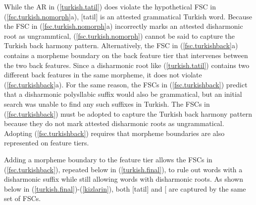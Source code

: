 \documentclass[,doc,floatsintext]{apa6}
\theoremstyle{definition}
\theoremstyle{definition}
\theoremstyle{definition}
\theoremstyle{remark}
\begin{document}
\noindent While the AR in (\ref{turkish.tatil}) does violate the
hypothetical FSC in (\ref{fsc.turkish.nomorph}a), {[}tatil{]} is an
attested grammatical Turkish word. Because the FSC in
(\ref{fsc.turkish.nomorph}a) incorrectly marks an attested disharmonic
root as ungrammtical, (\ref{fsc.turkish.nomorph}) cannot be said to
capture the Turkish back harmony pattern. Alternatively, the FSC in
(\ref{fsc.turkishback}a) contains a morpheme boundary on the back
feature tier that intervenes between the two back features. Since a
disharmonic root like (\ref{turkish.tatil}) contains two different back
features in the same morpheme, it does not violate
(\ref{fsc.turkishback}a). For the same reason, the FSCs in
(\ref{fsc.turkishback}) predict that a disharmonic polysllabic suffix
would also be grammatical, but an initial search was unable to find any
such suffixes in Turkish. The FSCs in (\ref{fsc.turkishback}) must be
adopted to capture the Turkish back harmony pattern because they do not
mark attested disharmonic roots as ungrammatical. Adopting
(\ref{fsc.turkishback}) requires that morpheme boundaries are also
represented on feature tiers.

Adding a morpheme boundary to the feature tier allows the FSCs in
(\ref{fsc.turkishback}), repeated below in (\ref{turkish.final}), to
rule out words with a disharmonic suffix while still allowing words with
disharmonic roots. As shown below in
(\ref{turkish.final})-(\ref{kizlarin}), both {[}tatil{]} and
{[}\textipa{\LARGE+}\textipa{1n}{]} are
captured by the same set of FSCs.
\end{document}
